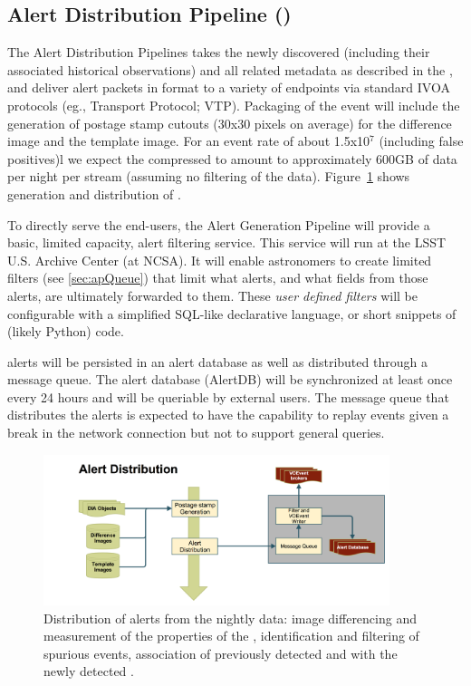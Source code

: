 \clearpage

\subsection{Alert Distribution Pipeline (\wbsAP)}

The Alert Distribution Pipelines takes the newly discovered \DIAObjects (including their associated historical observations) and all related metadata as described in the \DPDD, and deliver alert packets in \VOEvent format to a variety of endpoints via standard IVOA protocols (eg., \VOEvent Transport Protocol; VTP\@). Packaging of the event will include the generation of postage stamp cutouts (30x30 pixels on average) for the difference image and the template image. For an event rate of about 1.5x10$^7$ (including false positives)l we expect the compressed \VOEvents to amount to approximately 600GB of data per night per \VOEvent stream (assuming no filtering of the data).  Figure~\ref{fig:apAlertDistribution} shows generation and distribution of \VOEvents.

To directly serve the end-users, the Alert Generation Pipeline will provide a basic, limited capacity, alert filtering service. This service will run at the LSST U.S. Archive Center (at NCSA). It will enable astronomers to create limited  filters (see  \ref{sec:apQueue}) that limit what alerts, and what fields from those alerts, are ultimately forwarded to them. These \emph{user defined filters} will be configurable with a simplified SQL-like declarative language, or short snippets of (likely Python) code.

\VOEvent alerts will be persisted in an alert database as well as distributed through a message queue. The alert database (AlertDB) will be synchronized at least once every 24 hours and will be queriable by external users. The message queue that distributes the alerts is expected to have the capability  to replay events given a break in the network connection but not to support general queries.

\begin{figure}[th]
\begin{center}
\includegraphics[width=0.9\textwidth]{figures/Alert_Distribution.png}
\caption{\label{fig:apAlertDistribution} Distribution of alerts from the nightly data: image differencing and measurement of the properties of the \DIASources, identification and filtering of spurious events, association of previously detected \DIAObjects and \SSObjects with the newly detected \DIASources. }
\end{center}
\end{figure} 

